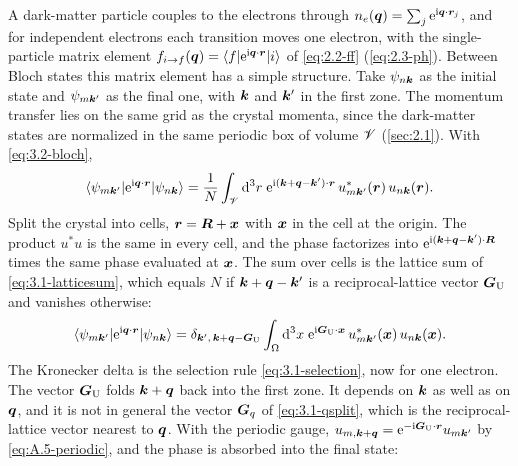 A dark-matter particle couples to the electrons through $n_e(\bm{q}) = \sum_j\mathrm{e}^{\mathrm{i}\bm{q}\cdot\bm{r}_j}$, and for independent electrons each transition moves one electron, with the single-particle matrix element $f_{i\to f}(\bm{q}) = \langle f|\mathrm{e}^{\mathrm{i}\bm{q}\cdot\bm{r}}|i\rangle$ of \cref{eq:2.2-ff} (\cref{eq:2.3-ph}). Between Bloch states this matrix element has a simple structure. Take $\psi_{n\bm{k}}$ as the initial state and $\psi_{m\bm{k}'}$ as the final one, with $\bm{k}$ and $\bm{k}'$ in the first zone. The momentum transfer lies on the same grid as the crystal momenta, since the dark-matter states are normalized in the same periodic box of volume $\mathscr{V}$ (\cref{sec:2.1}). With \cref{eq:3.2-bloch},
\begin{equation*}
  \langle\psi_{m\bm{k}'}|\mathrm{e}^{\mathrm{i}\bm{q}\cdot\bm{r}}|\psi_{n\bm{k}}\rangle
  = \frac1N\int_{\mathscr{V}}\mathrm{d}^3r\;\mathrm{e}^{\mathrm{i}(\bm{k}+\bm{q}-\bm{k}')\cdot\bm{r}}\,u^*_{m\bm{k}'}(\bm{r})\,u_{n\bm{k}}(\bm{r}) .
\end{equation*}
Split the crystal into cells, $\bm{r} = \bm{R} + \bm{x}$ with $\bm{x}$ in the cell at the origin. The product $u^*u$ is the same in every cell, and the phase factorizes into $\mathrm{e}^{\mathrm{i}(\bm{k}+\bm{q}-\bm{k}')\cdot\bm{R}}$ times the same phase evaluated at $\bm{x}$. The sum over cells is the lattice sum of \cref{eq:3.1-latticesum}, which equals $N$ if $\bm{k} + \bm{q} - \bm{k}'$ is a reciprocal-lattice vector $\bm{G}_{\mathrm{U}}$ and vanishes otherwise:
\begin{equation*}
  \langle\psi_{m\bm{k}'}|\mathrm{e}^{\mathrm{i}\bm{q}\cdot\bm{r}}|\psi_{n\bm{k}}\rangle
  = \delta_{\bm{k}',\,\bm{k}+\bm{q}-\bm{G}_{\mathrm{U}}}\int_\Omega\mathrm{d}^3x\;\mathrm{e}^{\mathrm{i}\bm{G}_{\mathrm{U}}\cdot\bm{x}}\,u^*_{m\bm{k}'}(\bm{x})\,u_{n\bm{k}}(\bm{x}) .
\end{equation*}
The Kronecker delta is the selection rule \cref{eq:3.1-selection}, now for one electron. The vector $\bm{G}_{\mathrm{U}}$ folds $\bm{k} + \bm{q}$ back into the first zone. It depends on $\bm{k}$ as well as on $\bm{q}$, and it is not in general the vector $\bm{G}_q$ of \cref{eq:3.1-qsplit}, which is the reciprocal-lattice vector nearest to $\bm{q}$. With the periodic gauge, $u_{m,\bm{k}+\bm{q}} = \mathrm{e}^{-\mathrm{i}\bm{G}_{\mathrm{U}}\cdot\bm{r}}u_{m\bm{k}'}$ by \cref{eq:A.5-periodic}, and the phase is absorbed into the final state:
